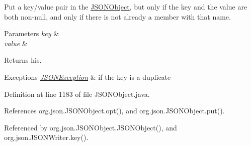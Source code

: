 Put a key/value pair in the \hyperlink{classorg_1_1json_1_1_j_s_o_n_object}{J\-S\-O\-N\-Object}, but only if the key and the value are both non-\/null, and only if there is not already a member with that name.


\begin{DoxyParams}{Parameters}
{\em key} & \\
\hline
{\em value} & \\
\hline
\end{DoxyParams}
\begin{DoxyReturn}{Returns}
his. 
\end{DoxyReturn}

\begin{DoxyExceptions}{Exceptions}
{\em \hyperlink{classorg_1_1json_1_1_j_s_o_n_exception}{J\-S\-O\-N\-Exception}} & if the key is a duplicate \\
\hline
\end{DoxyExceptions}


Definition at line 1183 of file J\-S\-O\-N\-Object.\-java.



References org.\-json.\-J\-S\-O\-N\-Object.\-opt(), and org.\-json.\-J\-S\-O\-N\-Object.\-put().



Referenced by org.\-json.\-J\-S\-O\-N\-Object.\-J\-S\-O\-N\-Object(), and org.\-json.\-J\-S\-O\-N\-Writer.\-key().


